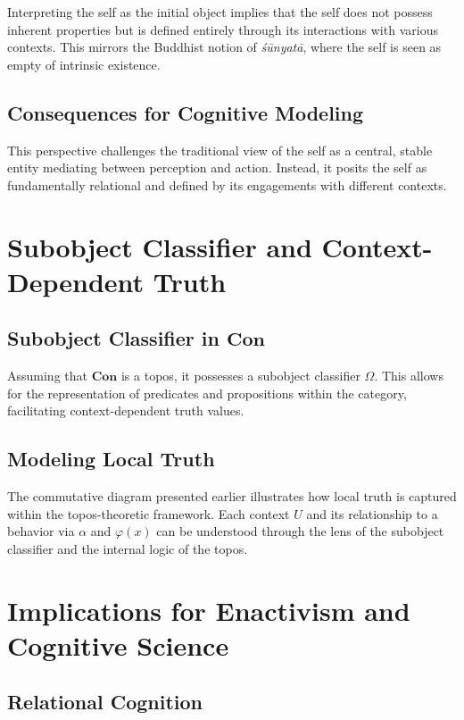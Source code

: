 \documentclass{article}
\begin{document}
Interpreting the self as the initial object implies that the self does not possess inherent properties but is defined entirely through its interactions with various contexts. This mirrors the Buddhist notion of \emph{śūnyatā}, where the self is seen as empty of intrinsic existence.

\subsection{Consequences for Cognitive Modeling}

This perspective challenges the traditional view of the self as a central, stable entity mediating between perception and action. Instead, it posits the self as fundamentally relational and defined by its engagements with different contexts.

\section{Subobject Classifier and Context-Dependent Truth}

\subsection{Subobject Classifier in $\mathbf{Con}$}

Assuming that $\mathbf{Con}$ is a topos, it possesses a subobject classifier $\Omega$. This allows for the representation of predicates and propositions within the category, facilitating context-dependent truth values.

\subsection{Modeling Local Truth}

The commutative diagram presented earlier illustrates how local truth is captured within the topos-theoretic framework. Each context $U$ and its relationship to a behavior via $\alpha$ and $\varphi(x)$ can be understood through the lens of the subobject classifier and the internal logic of the topos.

\section{Implications for Enactivism and Cognitive Science}

\subsection{Relational Cognition}
\end{document}
